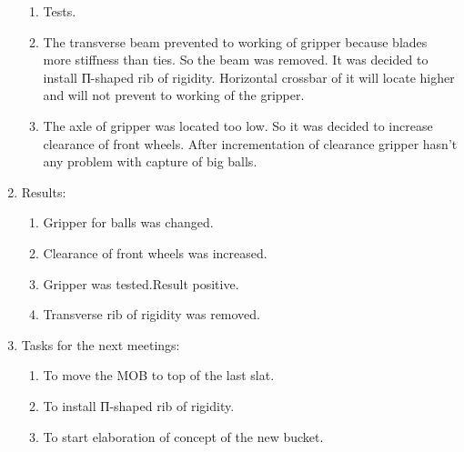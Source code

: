 \begin{enumerate}
\begin{enumerate}
		\item Tests.
		
		\item The transverse beam prevented to working of gripper because blades more stiffness than ties. So the beam was removed. It was decided to install П-shaped rib of rigidity. Horizontal crossbar of it will locate higher and will not prevent to working of the gripper.
		
		\item The axle of gripper was located too low. So it was decided to increase clearance of front wheels. After incrementation of clearance gripper hasn't any problem with capture of big balls.
		
		
	\end{enumerate}
	
	\item Results: 
	\begin{enumerate}
		\item Gripper for balls was changed.
		
		\item Clearance of front wheels was increased.
		
		\item Gripper was tested.Result positive.
		
		\item Transverse rib of rigidity was removed.
		
	\end{enumerate}
	
	\item Tasks for the next meetings:
	\begin{enumerate}
		\item To move the MOB to top of the last slat.
		
		\item To install П-shaped rib of rigidity.
		
		\item To start elaboration of concept of the new bucket.
		
	\end{enumerate}     
\end{enumerate}
\fillpage